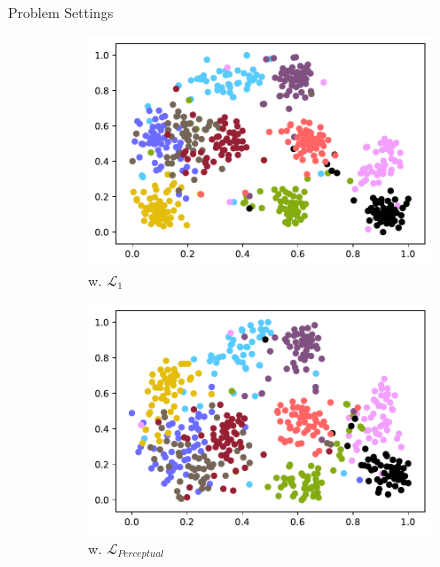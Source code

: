 \documentclass[final]{beamer}
\newlength{\colwidth}
\begin{document}
\begin{frame}[t]
\begin{columns}[t]
\begin{column}{\colwidth}
\begin{block}{Problem Settings}
  \begin{figure}
  \begin{subfigure}[c]{.22\linewidth}
    \captionsetup{justification=centering, labelformat=empty, font=small}
    \includegraphics[width=1\linewidth]{contents/feature-space/l1.pdf}
    \caption{w. $\mathcal{L}_1$}
  \end{subfigure}
  \hfill
  \begin{subfigure}[c]{.22\linewidth}
    \captionsetup{justification=centering, labelformat=empty, font=small}
    \includegraphics[width=1\linewidth]{contents/feature-space/vgg.pdf}
    \caption{w. $\mathcal{L}_{Perceptual}$}
  \end{subfigure}
  \hfill
  \begin{subfigure}[c]{.22\linewidth}
    \captionsetup{justification=centering, labelformat=empty, font=small}

\end{subfigure}
\end{figure}
\end{block}
\end{column}
\end{columns}
\end{frame}
\end{document}
